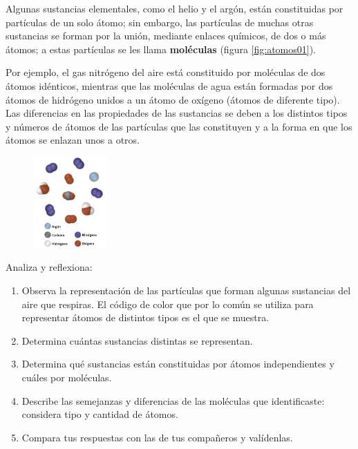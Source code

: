 \documentclass[11pt]{book}
\begin{document}
Algunas sustancias elementales, como el helio y el argón, están constituidas por partículas de un solo átomo; sin embargo, las
partículas de muchas otras sustancias se forman por la unión, mediante enlaces químicos, de dos o más átomos; a estas partículas
se les llama \textbf{moléculas} (figura \ref{fig:atomos01}).

Por ejemplo, el gas nitrógeno del aire está constituido por moléculas de dos átomos
idénticos, mientras que las moléculas de agua están formadas por dos átomos de
hidrógeno unidos a un átomo de oxígeno (átomos de diferente tipo).
Las diferencias en las propiedades de las sustancias se deben a los distintos tipos
y números de átomos de las partículas que las constituyen y a la forma en que los
átomos se enlazan unos a otros.\\

\begin{boxK}
  \begin{figure}
    \centering
    \includegraphics[width=0.25\textwidth]{atomos02.png}
    \label{fig:atomos02}
  \end{figure}
  Analiza y reflexiona:\\
  \begin{enumerate}
    \item Observa la representación de las partículas que
          forman algunas sustancias del aire que respiras.
          El código de color que por lo común se utiliza
          para representar átomos de distintos tipos es el
          que se muestra.
    \item Determina cuántas sustancias distintas se representan.
    \item Determina qué sustancias están constituidas por átomos independientes y cuáles por moléculas.
    \item Describe las semejanzas y diferencias de las moléculas que identificaste: considera tipo y cantidad de átomos.
    \item Compara tus respuestas con las de tus compañeros y valídenlas.
  \end{enumerate}%
\end{boxK}
\end{document}

